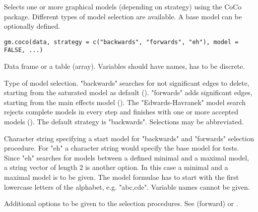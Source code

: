 \begin{Description}\relax
Selects one or more graphical models (depending on strategy) using the CoCo package.
Different types of model selection are available. A base model can be optionally defined.
\end{Description}
\begin{Usage}
\begin{verbatim}
gm.coco(data, strategy = c("backwards", "forwards", "eh"), model = FALSE, ...)
\end{verbatim}
\end{Usage}
\begin{Arguments}
\begin{ldescription}
\item[\code{data}] Data frame or a table (array). Variables should have names,  has to be discrete. 
\item[\code{strategy}] Type of model selection. "backwards" searches for not significant edges to delete, starting from the saturated model as default ().
"forwards" adds significant edges, starting from the main effects model (). The "Edwards-Havranek"
model search rejects complete models in every step and finishes with one or more accepted models ().
The default strategy is "backwards". Selections may be abbreviated.

\item[\code{model}] Character string specifying a start model for "backwards" and "forwards" selection procedure.
For "eh" a character string would specify the base model for tests.
Since "eh" searches for models between a defined minimal and a maximal model, a string vector of length 2 is another option.
In this case a minimal and a maximal model is to be given.
The model formulae has to start with the first lowercase letters of the alphabet, e.g. "abc,cde". Variable names cannot be given.

\item[\code{...}] Additional options to be given to the selection procedures. See  (forward) or . 
\end{ldescription}
\end{Arguments}
